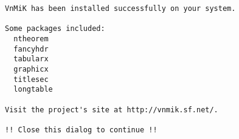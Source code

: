 \documentclass{article}
\begin{document}
\begin{verbatim}
VnMiK has been installed successfully on your system.

Some packages included:
  ntheorem
  fancyhdr
  tabularx
  graphicx
  titlesec
  longtable  

Visit the project's site at http://vnmik.sf.net/. 

!! Close this dialog to continue !!
\end{verbatim}
\end{document}
